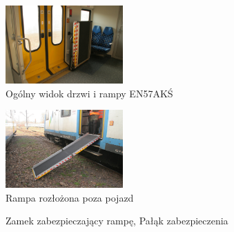 \begin{figure}
	\includegraphics[width=0.4\textwidth]{skryptkierownik-img/skryptkierownik-img060.jpg}
	\caption{Ogólny widok drzwi i rampy EN57AKŚ}
\end{figure}
\begin{figure}
 \includegraphics[width=0.4\textwidth]{skryptkierownik-img/skryptkierownik-img063.jpg}
	\caption{Rampa rozłożona poza pojazd}
\end{figure}


\begin{figure}
	\caption{Zamek zabezpieczający rampę, Pałąk zabezpieczenia}
\end{figure}

